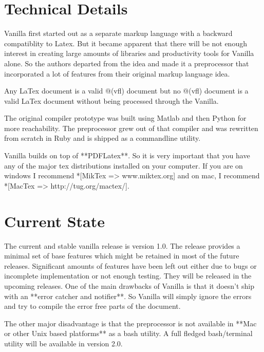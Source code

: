 \documentclass{article}
\begin{document}
\section*{Technical Details}

Vanilla first started out as a separate markup language with a backward compatiblity to Latex. But it became apparent that there will be not enough interest in creating large amounts of libraries and productivity tools for Vanilla alone. So the authors departed from the idea and made it a preprocessor that incorporated a lot of features from their original markup language idea. \vspace{5pt}

Any LaTex document is a valid @(vfl) document but no @(vfl) document is a valid LaTex document without being processed through the Vanilla. \vspace{5pt}

The original compiler prototype was built using Matlab and then Python for more reachability. The preprocessor grew out of that compiler and was rewritten from scratch in Ruby and is shipped as a commandline utility.\vspace{5pt}

Vanilla builds on top of **PDFLatex**. So it is very important that you have any of the major tex distributions installed on your computer. If you are on windows I recommend *[MikTex => www.miktex.org] and on mac, I recommend *[MacTex => http://tug.org/mactex/]. \vspace{5pt}

\section*{Current State}

The current and stable vanilla release is version 1.0. The release provides a minimal set of base features which might be retained in most of the future releases. Significant amounts of features have been left out either due to bugs or incomplete implementation or not enough testing. They will be released in the upcoming releases. One of the main drawbacks of Vanilla is that it doesn't ship with an **error catcher and notifier**.  So Vanilla will simply ignore the errors and try to compile the error free parts of the document.\vspace{5pt}

The other major disadvantage is that the preprocessor is not available in **Mac or other Unix based platforms** as a bash utility. A full fledged bash/terminal utility will be available in version 2.0.\vspace{5pt}       
\end{document}

